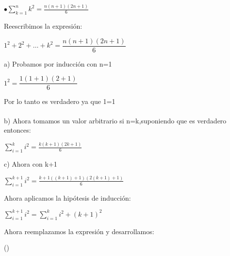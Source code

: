 \documentclass[12pt,a4paper,scrartcl]{article}
\begin{document}
\newpage
\begin{flushleft}
$\displaystyle\bullet
\sum_{k=1}^{n}k^{2} = \frac{n(n+1)(2n+1)}{6}$
\end{flushleft}
Reescribimos la expresi\'on:
\begin{center}
$1^2+2^2+\ldots+k^2=\dfrac{n(n+1)(2n+1)}{6}$\\
\end{center}
a) Probamos por inducci\'on con n=1
\begin{center}
$1^2=\dfrac{1(1+1)(2+1)}{6}$\\
\end{center}
Por lo tanto es verdadero ya que 1=1\\\vspace{1em}
\\b) Ahora tomamos un valor arbitrario si n=k,suponiendo que es verdadero entonces:\\ 
\begin{center}
$\displaystyle
\sum_{i=1}^{k}i^{2} = \frac{k(k+1)(2k+1)}{6}$ \\
\end{center}
\begin{flushleft}
c) Ahora con k+1\\
\end{flushleft}
$\displaystyle
\sum_{i=1}^{k+1}i^{2} = \frac{k+1((k+1)+1)(2(k+1)+1)}{6}$ \\
\begin{flushleft}
Ahora aplicamos la hip\'otesis de inducci\'on:
\end{flushleft}
\begin{center}
$\displaystyle
\sum_{i=1}^{k+1}i^{2} = \sum_{i=1}^{k}i^{2} + (k+1)^2$ \\
\end{center}
\begin{flushleft}
Ahora reemplazamos la expresi\'on y desarrollamos:
\end{flushleft}

()
\end{document}
